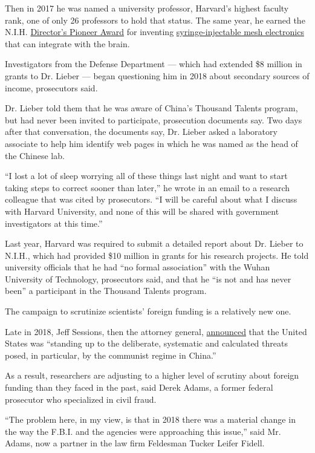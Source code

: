 Then in 2017 he was named a university professor, Harvard's highest
faculty rank, one of only 26 professors to hold that status. The same
year, he earned the N.I.H.
\href{https://commonfund.nih.gov/pioneer}{Director's Pioneer Award} for
inventing
\href{https://commonfund.nih.gov/pioneer/AwardRecipients17}{syringe-injectable
mesh electronics} that can integrate with the brain.

Investigators from the Defense Department --- which had extended \$8
million in grants to Dr. Lieber --- began questioning him in 2018 about
secondary sources of income, prosecutors said.

Dr. Lieber told them that he was aware of China's Thousand Talents
program, but had never been invited to participate, prosecution
documents say. Two days after that conversation, the documents say, Dr.
Lieber asked a laboratory associate to help him identify web pages in
which he was named as the head of the Chinese lab.

``I lost a lot of sleep worrying all of these things last night and want
to start taking steps to correct sooner than later,'' he wrote in an
email to a research colleague that was cited by prosecutors. ``I will be
careful about what I discuss with Harvard University, and none of this
will be shared with government investigators at this time.''

Last year, Harvard was required to submit a detailed report about Dr.
Lieber to N.I.H., which had provided \$10 million in grants for his
research projects. He told university officials that he had ``no formal
association'' with the Wuhan University of Technology, prosecutors said,
and that he ``is not and has never been'' a participant in the Thousand
Talents program.

The campaign to scrutinize scientists' foreign funding is a relatively
new one.

Late in 2018, Jeff Sessions, then the attorney general,
\href{https://www.justice.gov/opa/speech/attorney-general-jeff-sessions-announces-new-initiative-combat-chinese-economic-espionage}{announced}
that the United States was ``standing up to the deliberate, systematic
and calculated threats posed, in particular, by the communist regime in
China.''

As a result, researchers are adjusting to a higher level of scrutiny
about foreign funding than they faced in the past, said Derek Adams, a
former federal prosecutor who specialized in civil fraud.

``The problem here, in my view, is that in 2018 there was a material
change in the way the F.B.I. and the agencies were approaching this
issue,'' said Mr. Adams, now a partner in the law firm Feldesman Tucker
Leifer Fidell.

